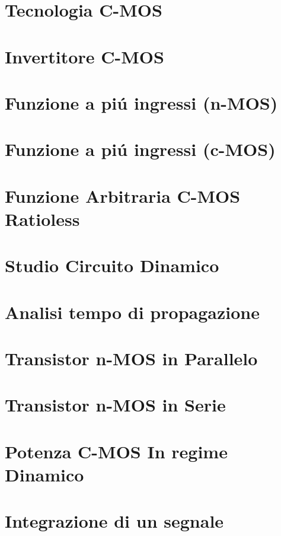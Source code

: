 \documentclass{article}
\begin{document}
\section{Tecnologia C-MOS}
\section{Invertitore C-MOS}
\section{Funzione a pi\'u ingressi (n-MOS)}
\section{Funzione a pi\'u ingressi (c-MOS)}
\section{Funzione Arbitraria C-MOS Ratioless}
\section{Studio Circuito Dinamico}
\section{Analisi tempo di propagazione}
\section{Transistor n-MOS in Parallelo}
\section{Transistor n-MOS in Serie}
\section{Potenza C-MOS In regime Dinamico}
% 
% 



% 




\section{Integrazione di un segnale}
\end{document}
